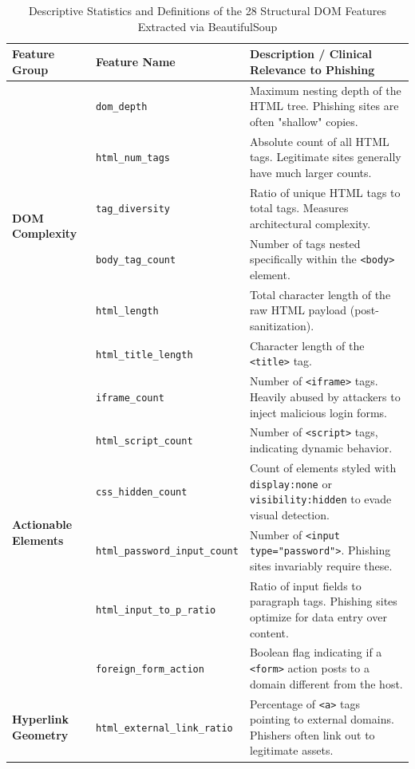 \documentclass[conference]{IEEEtran}
\begin{document}
\begin{table}[t]
\caption{Descriptive Statistics and Definitions of the 28 Structural DOM Features Extracted via BeautifulSoup}
\label{tab:features}
\begin{center}
\begin{tabular}{llp{10cm}}
\toprule
\textbf{Feature Group} & \textbf{Feature Name} & \textbf{Description / Clinical Relevance to Phishing} \\
\midrule
\multirow{6}{*}{\textbf{DOM Complexity}} 
& \texttt{dom\_depth} & Maximum nesting depth of the HTML tree. Phishing sites are often "shallow" copies. \\
& \texttt{html\_num\_tags} & Absolute count of all HTML tags. Legitimate sites generally have much larger counts. \\
& \texttt{tag\_diversity} & Ratio of unique HTML tags to total tags. Measures architectural complexity. \\
& \texttt{body\_tag\_count} & Number of tags nested specifically within the \texttt{<body>} element. \\
& \texttt{html\_length} & Total character length of the raw HTML payload (post-sanitization). \\
& \texttt{html\_title\_length} & Character length of the \texttt{<title>} tag. \\
\midrule
\multirow{6}{*}{\textbf{Actionable Elements}} 
& \texttt{iframe\_count} & Number of \texttt{<iframe>} tags. Heavily abused by attackers to inject malicious login forms. \\
& \texttt{html\_script\_count} & Number of \texttt{<script>} tags, indicating dynamic behavior. \\
& \texttt{css\_hidden\_count} & Count of elements styled with \texttt{display:none} or \texttt{visibility:hidden} to evade visual detection. \\
& \texttt{html\_password\_input\_count} & Number of \texttt{<input type="password">}. Phishing sites invariably require these. \\
& \texttt{html\_input\_to\_p\_ratio} & Ratio of input fields to paragraph tags. Phishing sites optimize for data entry over content. \\
& \texttt{foreign\_form\_action} & Boolean flag indicating if a \texttt{<form>} action posts to a domain different from the host. \\
\midrule
\multirow{4}{*}{\textbf{Hyperlink Geometry}} 
& \texttt{html\_external\_link\_ratio} & Percentage of \texttt{<a>} tags pointing to external domains. Phishers often link out to legitimate assets. \\

\end{tabular}
\end{center}
\end{table}
\end{document}
